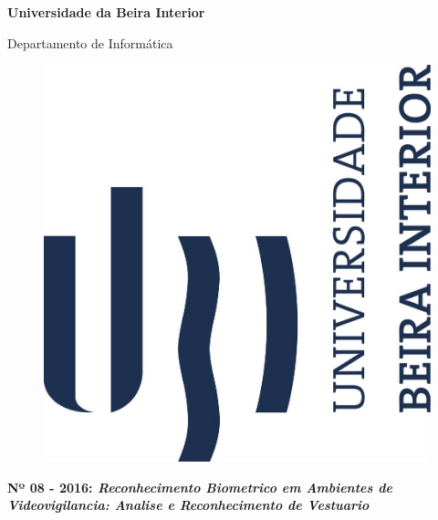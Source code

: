 
\thispagestyle{empty}
\setcounter{page}{-1}

\begin{center}
\begin{Huge}
\textbf{Universidade da Beira Interior}
\end{Huge}
\end{center}

\begin{center}
\begin{Huge}
Departamento de Informática
\end{Huge}
\end{center}

\vspace{0,07cm}
\begin{figure}[!htb]
\centering
\includegraphics[scale=0.5]{brasao.JPG}
\end{figure}

\vspace{0.5cm}
\begin{center}
\begin{Large}
\textbf{Nº 08 - 2016: \emph{Reconhecimento Biometrico em Ambientes de
Videovigilancia: Analise e Reconhecimento de Vestuario}}
\end{Large}
\end{center}


